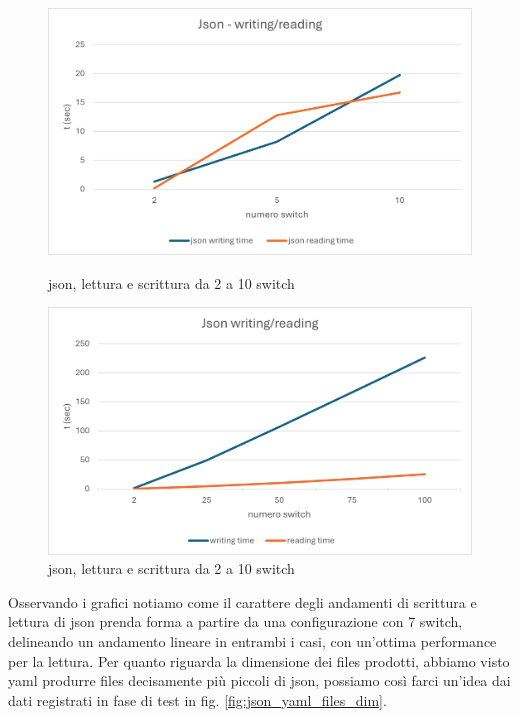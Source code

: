 \documentclass[binding=0.6cm]{sapthesis}
\begin{document}
\begin{figure}[h]
    \centering
    \begin{minipage}{0.48\textwidth}
      \includegraphics[width=\linewidth]{immagini/json_wr_nature.png}
      \caption{json, lettura e scrittura da 2 a 10 switch}
      \label{fig:json_wr_nature}
    \end{minipage}\hfill
    \begin{minipage}{0.48\textwidth}
      \includegraphics[width=\linewidth]{immagini/json_writing_reading.png}
      \caption{json, lettura e scrittura da 2 a 10 switch}
      \label{fig:json_writing_reading}
    \end{minipage}
\end{figure}

Osservando i grafici notiamo come il carattere degli andamenti di scrittura e lettura di json prenda forma a partire da una configurazione con 7 switch,
delineando un andamento lineare in entrambi i casi, con un'ottima performance per la lettura. Per quanto riguarda la dimensione dei files prodotti, abbiamo visto yaml produrre
files decisamente più piccoli di json, possiamo così farci un'idea dai dati registrati in fase di test in fig. \ref{fig:json_yaml_files_dim}.
\end{document}
